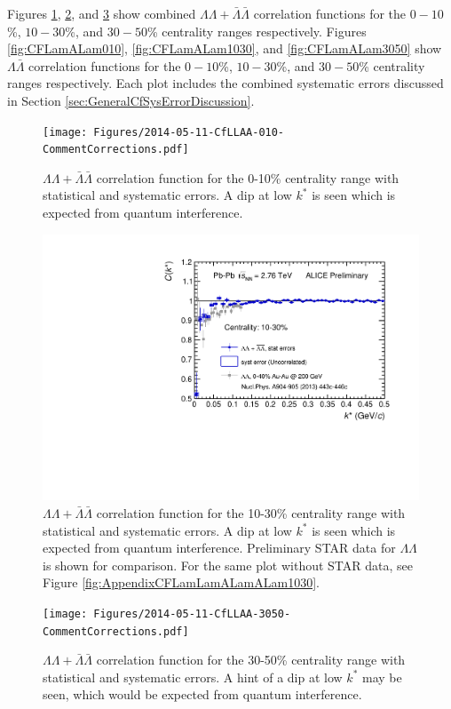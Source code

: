 Figures \ref{fig:CFLamLamALamALam010}, \ref{fig:CFLamLamALamALam1030STAR}, and \ref{fig:CFLamLamALamALam3050} show combined $\Lambda\Lambda + \bar{\Lambda}\bar{\Lambda}$ correlation functions for the $0-10$\%, $10-30$\%, and $30-50$\% centrality ranges respectively.  
Figures \ref{fig:CFLamALam010}, \ref{fig:CFLamALam1030}, and \ref{fig:CFLamALam3050} show $\Lambda\bar{\Lambda}$ correlation functions for the $0-10$\%, $10-30$\%, and $30-50$\% centrality ranges respectively.  
Each plot includes the combined systematic errors discussed in Section \ref{sec:GeneralCfSysErrorDiscussion}.

\begin{figure}[hbtp]
\texttt{[image: Figures/2014-05-11-CfLLAA-010-CommentCorrections.pdf]}
\caption[$\Lambda\Lambda + \bar{\Lambda}\bar{\Lambda}$ correlation function for the 0-10\% centrality range]{$\Lambda\Lambda + \bar{\Lambda}\bar{\Lambda}$ correlation function for the 0-10\% centrality range with statistical and systematic errors.  
A dip at low $k^*$ is seen which is expected from quantum interference.}
\label{fig:CFLamLamALamALam010}
\end{figure}
\begin{figure}[hbtp]
\includegraphics[width=36pc]{Figures/2014-05-11-CfLLAA-1030-CommentCorrections-WithSTAR.pdf}
\caption[$\Lambda\Lambda + \bar{\Lambda}\bar{\Lambda}$ correlation function for the 10-30\% centrality range]{$\Lambda\Lambda + \bar{\Lambda}\bar{\Lambda}$ correlation function for the 10-30\% centrality range with statistical and systematic errors.  
A dip at low $k^*$ is seen which is expected from quantum interference.  Preliminary STAR data for $\Lambda\Lambda$ is shown for comparison.  
For the same plot without STAR data, see Figure \ref{fig:AppendixCFLamLamALamALam1030}.}
\label{fig:CFLamLamALamALam1030STAR}
\end{figure}
\begin{figure}[hbtp]
\texttt{[image: Figures/2014-05-11-CfLLAA-3050-CommentCorrections.pdf]}
\caption[$\Lambda\Lambda + \bar{\Lambda}\bar{\Lambda}$ correlation function for the 30-50\% centrality range]{$\Lambda\Lambda + \bar{\Lambda}\bar{\Lambda}$ correlation function for the 30-50\% centrality range with statistical and systematic errors.  
A hint of a dip at low $k^*$ may be seen, which would be expected from quantum interference.}
\label{fig:CFLamLamALamALam3050}
\end{figure}

